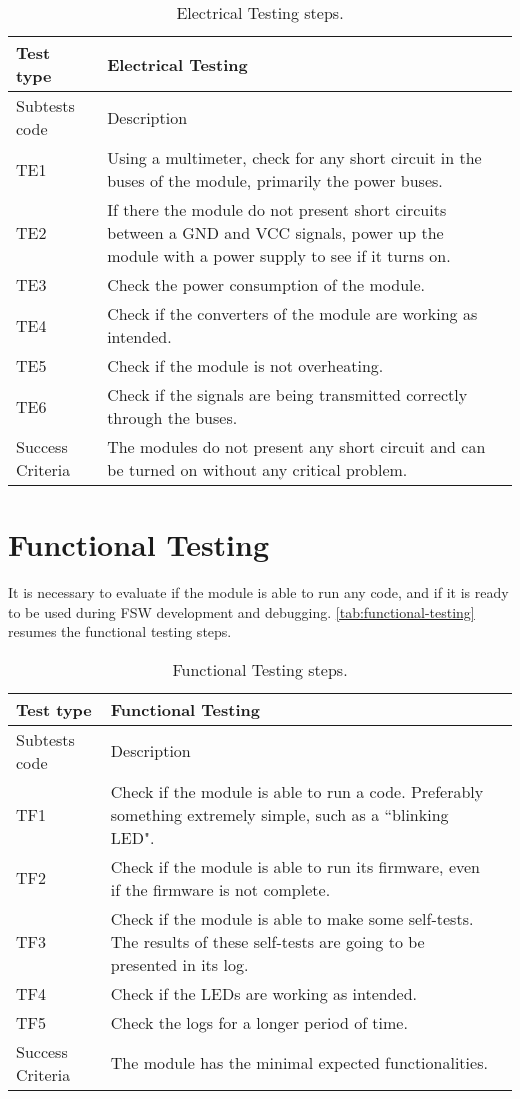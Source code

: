 \begin{table}[!htb]
\centering
\caption{Electrical Testing steps.}
\label{tab:electrical-testing}
\begin{tabular}{m{3cm} m{12cm} m{3cm}}
\toprule
Test type & Electrical Testing \\
\midrule
\midrule
Subtests code & Description \\ 
\midrule
TE1 & Using a multimeter, check for any short circuit in the buses of the module, primarily the power buses. \\
\midrule
TE2 & If there the module do not present short circuits between a GND and VCC signals, power up the module with a power supply to see if it turns on. \\
\midrule
TE3 & Check the power consumption of the module. \\
\midrule
TE4 & Check if the converters of the module are working as intended. \\
\midrule
TE5 & Check if the module is not overheating. \\
\midrule
TE6 & Check if the signals are being transmitted correctly through the buses. \\
\midrule
\midrule
Success Criteria & The modules do not present any short circuit and can be turned on without any critical problem. \\
\bottomrule
\end{tabular}
\end{table}

\section {Functional Testing}

It is necessary to evaluate if the module is able to run any code, and if it is ready to be used during FSW development and debugging. \autoref{tab:functional-testing} resumes the functional testing steps.

\begin{table}[!htb]
\centering
\caption{Functional Testing steps.}
\label{tab:functional-testing}
\begin{tabular}{m{3cm} m{12cm} m{3cm}}
\toprule
Test type & Functional Testing \\
\midrule
\midrule
Subtests code & Description \\ 
\midrule
TF1 & Check if the module is able to run a code. Preferably something extremely simple, such as a ``blinking LED". \\
\midrule
TF2 & Check if the module is able to run its firmware, even if the firmware is not complete. \\
\midrule
TF3 & Check if the module is able to make some self-tests. The results of these self-tests are going to be presented in its log. \\
\midrule
TF4 & Check if the LEDs are working as intended. \\
\midrule
TF5 & Check the logs for a longer period of time. \\
\midrule
\midrule
Success Criteria & The module has the minimal expected functionalities. \\
\bottomrule
\end{tabular}
\end{table}
 
